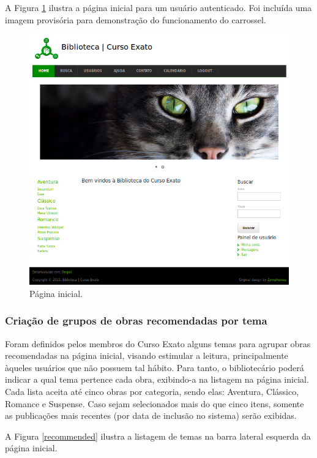 \documentclass[a4paper]{article}
\begin{document}
A Figura \ref{home} ilustra a página inicial para um usuário autenticado. Foi incluída uma imagem provisória para demonstração do funcionamento do carrossel.

\begin{figure}[pbth!]
\centering
\includegraphics[width=140mm]{img/home-small.png}
\caption{Página inicial.\label{home}}
\end{figure}


\subsubsection{Criação de grupos de obras recomendadas por tema}
Foram definidos pelos membros do Curso Exato alguns temas para agrupar obras recomendadas na página inicial, visando estimular a leitura, principalmente àqueles usuários que não possuem tal hábito. Para tanto, o bibliotecário poderá indicar a qual tema pertence cada obra, exibindo-a na listagem na página inicial. Cada lista aceita até cinco obras por categoria, sendo elas: Aventura, Clássico, Romance e Suspense. Caso sejam selecionados mais do que cinco itens, somente as publicações mais recentes (por data de inclusão no sistema) serão exibidas.

A Figura \ref{recommended} ilustra a listagem de temas na barra lateral esquerda da página inicial.
\end{document}
